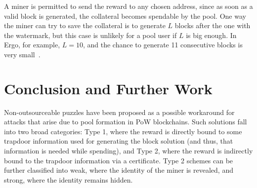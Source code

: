 \documentclass[runningheads]{llncs}
\begin{document}
A miner is permitted to send the reward to any chosen address, since as soon as a valid block is generated, the collateral becomes spendable by the pool. One way the miner can try to save the collateral is to generate $L$ blocks after the one with the watermark, but this case is unlikely for a pool user if $L$ is big enough. In Ergo, for example, $L = 10$, and the chance to generate 11 consecutive blocks is very small~\cite{Nak08}. 




\section{Conclusion and Further Work}
\label{conclusion}

Non-outsourceable puzzles have been proposed as a possible workaround for attacks that arise due to pool formation in PoW blockchains. Such solutions fall into two broad categories: Type 1, where the reward is directly bound to some trapdoor information used for generating the block solution (and thus, that information is needed while spending), and Type 2, where the reward is indirectly bound to the trapdoor information via a certificate. Type 2 schemes can be further classified into weak, where the identity of the miner is revealed, and strong, where the identity remains hidden. 
\end{document}
